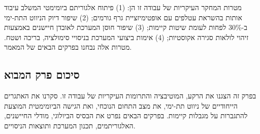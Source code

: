 מטרות המחקר העיקריות של עבודה זו הן: (1) פיתוח אלגוריתם  ביומימטי המשלב עיבוד אותות בהשראת עטלפים עם אופטימיזציית גרף גורמים; (2) שיפור דיוק הניווט התת-ימי ב-30\% לפחות לעומת שיטות קיימות; (3) שיפור חוסן המערכת לאובדן חיישנים באמצעות זיהוי לולאות סגירה אקוסטיות; (4) אימות ביצועי המערכת בניסויי סימולציה, בריכה ושטח. מטרות אלה נבחנו בפרקים הבאים של המאמר.

\subsection{סיכום פרק המבוא}
\label{sec:intro_summary}

בפרק זה הצגנו את הרקע, המוטיבציה והתרומות העיקריות של עבודה זו. סקרנו את האתגרים הייחודיים של ניווט תת-ימי, את מצב התחום הנוכחי, ואת הגישה הביומימטית המוצעת להתגברות על מגבלות קיימות. בפרקים הבאים נפרט את הבסיס הביולוגי, מודלי החיישנים, האלגוריתמים, תכנון המערכת ותוצאות הניסויים.